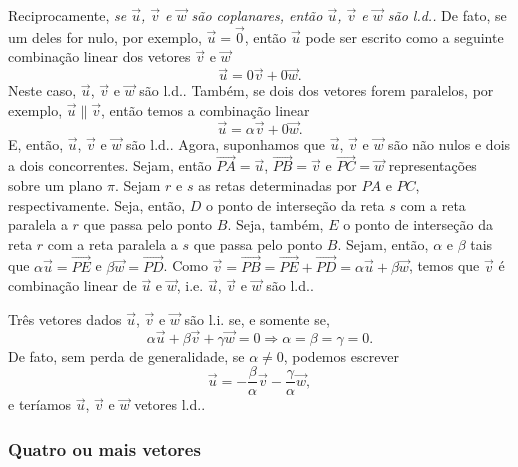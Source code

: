 Reciprocamente, \emph{se $\vec{u}$, $\vec{v}$ e $\vec{w}$ são coplanares, então $\vec{u}$, $\vec{v}$ e $\vec{w}$ são l.d..} De fato, se um deles for nulo, por exemplo, $\vec{u}=\vec{0}$, então $\vec{u}$ pode ser escrito como a seguinte combinação linear dos vetores $\vec{v}$ e $\vec{w}$
\begin{equation}
  \vec{u} = 0\vec{v} + 0\vec{w}.
\end{equation}
Neste caso, $\vec{u}$, $\vec{v}$ e $\vec{w}$ são l.d.. Também, se dois dos vetores forem paralelos, por exemplo, $\vec{u}\parallel\vec{v}$, então temos a combinação linear
\begin{equation}
  \vec{u} = \alpha\vec{v} + 0\vec{w}.
\end{equation}
E, então, $\vec{u}$, $\vec{v}$ e $\vec{w}$ são l.d.. Agora, suponhamos que $\vec{u}$, $\vec{v}$ e $\vec{w}$ são não nulos e dois a dois concorrentes. Sejam, então $\overrightarrow{PA}=\vec{u}$, $\overrightarrow{PB}=\vec{v}$ e $\overrightarrow{PC}=\vec{w}$ representações sobre um plano $\pi$. Sejam $r$ e $s$ as retas determinadas por $PA$ e $PC$, respectivamente. Seja, então, $D$ o ponto de interseção da reta $s$ com a reta paralela a $r$ que passa pelo ponto $B$. Seja, também, $E$ o ponto de interseção da reta $r$ com a reta paralela a $s$ que passa pelo ponto $B$. Sejam, então, $\alpha$ e $\beta$ tais que $\alpha\vec{u}=\overrightarrow{PE}$ e $\beta\vec{w}=\overrightarrow{PD}$. Como $\vec{v} = \overrightarrow{PB} = \overrightarrow{PE} + \overrightarrow{PD} = \alpha\vec{u}+\beta\vec{w}$, temos que $\vec{v}$ é combinação linear de $\vec{u}$ e $\vec{w}$, i.e. $\vec{u}$, $\vec{v}$ e $\vec{w}$ são l.d..

\begin{obs}\label{obs:cbsc_li}
  Três vetores dados $\vec{u}$, $\vec{v}$ e $\vec{w}$ são l.i. se, e somente se, 
  \begin{equation}
    \alpha\vec{u} + \beta\vec{v} + \gamma\vec{w} = 0 \Rightarrow \alpha=\beta=\gamma = 0.
  \end{equation}
  De fato, sem perda de generalidade, se $\alpha\neq 0$, podemos escrever
  \begin{equation}
    \vec{u} = -\frac{\beta}{\alpha}\vec{v} - \frac{\gamma}{\alpha}\vec{w},
  \end{equation}
  e teríamos $\vec{u}$, $\vec{v}$ e $\vec{w}$ vetores l.d..
\end{obs}

\subsubsection{Quatro ou mais vetores}


